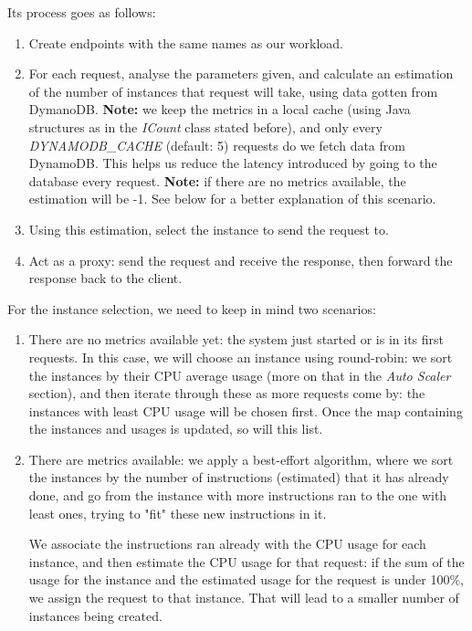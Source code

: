 \documentclass{article}
\begin{document}
Its process goes as follows:
\begin{enumerate}
    \item Create endpoints with the same names as our workload.
    \item For each request, analyse the parameters given, and calculate an
        estimation of the number of instances that request will take, using data
        gotten from DymanoDB.
        \subitem \textbf{Note:} we keep the metrics in a local cache (using Java
        structures as in the \textit{ICount} class stated before), and only
        every \textit{DYNAMODB\_CACHE} (default: 5) requests do we fetch data
        from DynamoDB. This helps us reduce the latency introduced by going to
        the database every request.
        \subitem \textbf{Note:} if there are no metrics available, the
        estimation will be -1. See below for a better explanation of this
        scenario.
    \item Using this estimation, select the instance to send the request to.
    \item Act as a proxy: send the request and receive the response, then
        forward the response back to the client.
\end{enumerate}

For the instance selection, we need to keep in mind two scenarios:
\begin{enumerate}
    \item There are no metrics available yet: the system just started or is in
        its first requests. In this case, we will choose an instance using
        round-robin: we sort the instances by their CPU average usage (more on
        that in the \textit{Auto Scaler} section), and then iterate through
        these as more requests come by: the instances with least CPU usage will
        be chosen first. Once the map containing the instances and usages is
        updated, so will this list.
    \item There are metrics available: we apply a best-effort algorithm, where
        we sort the instances by the number of instructions (estimated) that it
        has already done, and go from the instance with more instructions ran to
        the one with least ones, trying to "fit" these new instructions in it.

        We associate the instructions ran already with the CPU usage for each
        instance, and then estimate the CPU usage for that request: if the sum
        of the usage for the instance and the estimated usage for the request
        is under 100\%, we assign the request to that instance. That will lead
        to a smaller number of instances being created.
\end{enumerate}
\end{document}
